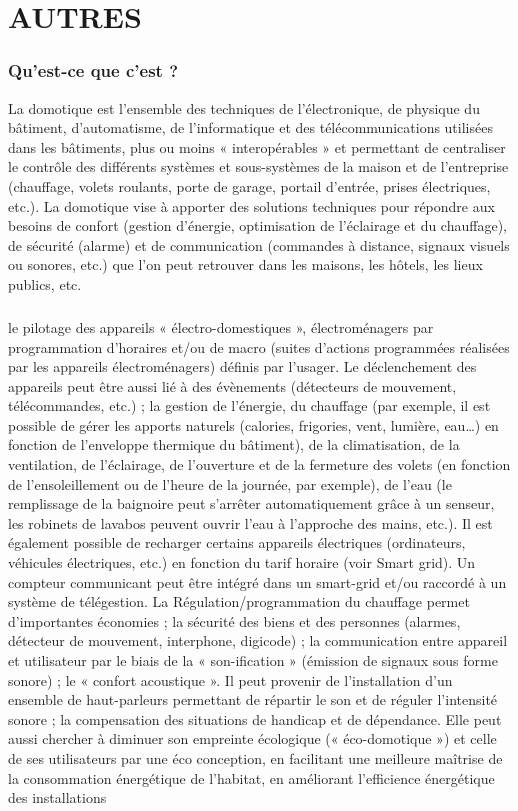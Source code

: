 \chapter{AUTRES}
        \subsection{Qu’est-ce que c’est ?}
La domotique est l’ensemble des techniques de l'électronique, de physique du bâtiment, d'automatisme, de l'informatique et des télécommunications utilisées dans les bâtiments, plus ou moins « interopérables » et permettant de centraliser le contrôle des différents systèmes et sous-systèmes de la maison et de l'entreprise (chauffage, volets roulants, porte de garage, portail d'entrée, prises électriques, etc.).
La domotique vise à apporter des solutions techniques pour répondre aux besoins de confort (gestion d'énergie, optimisation de l'éclairage et du chauffage), de sécurité (alarme) et de communication (commandes à distance, signaux visuels ou sonores, etc.) que l'on peut retrouver dans les maisons, les hôtels, les lieux publics, etc.
            \paragraph{}
le pilotage des appareils « électro-domestiques », électroménagers par programmation d'horaires et/ou de macro (suites d'actions programmées réalisées par les appareils électroménagers) définis par l'usager. Le déclenchement des appareils peut être aussi lié à des évènements (détecteurs de mouvement, télécommandes, etc.) ;
la gestion de l'énergie, du chauffage (par exemple, il est possible de gérer les apports naturels (calories, frigories, vent, lumière, eau…) en fonction de l'enveloppe thermique du bâtiment), de la climatisation, de la ventilation, de l'éclairage, de l’ouverture et de la fermeture des volets (en fonction de l'ensoleillement ou de l'heure de la journée, par exemple), de l'eau (le remplissage de la baignoire peut s’arrêter automatiquement grâce à un senseur, les robinets de lavabos peuvent ouvrir l’eau à l’approche des mains, etc.). Il est également possible de recharger certains appareils électriques (ordinateurs, véhicules électriques, etc.) en fonction du tarif horaire (voir Smart grid). Un compteur communicant peut être intégré dans un smart-grid et/ou raccordé à un système de télégestion. La Régulation/programmation du chauffage permet d'importantes économies ;
la sécurité des biens et des personnes (alarmes, détecteur de mouvement, interphone, digicode) ;
la communication entre appareil et utilisateur par le biais de la « son-ification » (émission de signaux sous forme sonore) ;
le « confort acoustique ». Il peut provenir de l'installation d'un ensemble de haut-parleurs permettant de répartir le son et de réguler l’intensité sonore ;
la compensation des situations de handicap et de dépendance.
Elle peut aussi chercher à diminuer son empreinte écologique (« éco-domotique ») et celle de ses utilisateurs par une éco conception, en facilitant une meilleure maîtrise de la consommation énergétique de l'habitat, en améliorant l'efficience énergétique des installations
